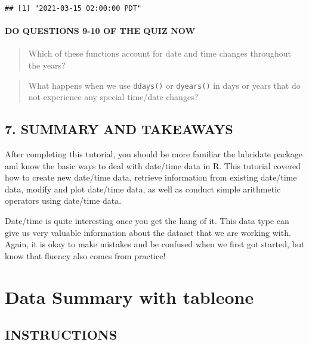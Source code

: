 \documentclass[
]{book}
\begin{document}
\begin{verbatim}
## [1] "2021-03-15 02:00:00 PDT"
\end{verbatim}

\hypertarget{do-questions-9-10-of-the-quiz-now}{%
\subsubsection{DO QUESTIONS 9-10 OF THE QUIZ NOW}\label{do-questions-9-10-of-the-quiz-now}}

\begin{quote}
Which of these functions account for date and time changes throughout the years?
\end{quote}

\begin{quote}
What happens when we use \texttt{ddays()} or \texttt{dyears()} in days or years that do not experience any special time/date changes?
\end{quote}

\hypertarget{summary-and-takeaways-1}{%
\section{7. SUMMARY AND TAKEAWAYS}\label{summary-and-takeaways-1}}

After completing this tutorial, you should be more familiar the lubridate package and know the basic ways to deal with date/time data in R. This tutorial covered how to create new date/time data, retrieve information from existing date/time data, modify and plot date/time data, as well as conduct simple arithmetic operators using date/time data.

Date/time is quite interesting once you get the hang of it. This data type can give us very valuable information about the dataset that we are working with. Again, it is okay to make mistakes and be confused when we first got started, but know that fluency also comes from practice!

\hypertarget{data-summary-with-tableone}{%
\chapter{Data Summary with tableone}\label{data-summary-with-tableone}}

\hypertarget{instructions-7}{%
\section{INSTRUCTIONS}\label{instructions-7}}
\end{document}
